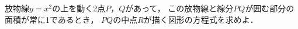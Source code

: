 \documentclass[../../main.tex]{subfiles}
\begin{document}
放物線$y=x^2$の上を動く2点$P$，$Q$があって，
この放物線と線分$PQ$が囲む部分の面積が常に1であるとき，
$PQ$の中点$R$が描く図形の方程式を求めよ．
\end{document}
